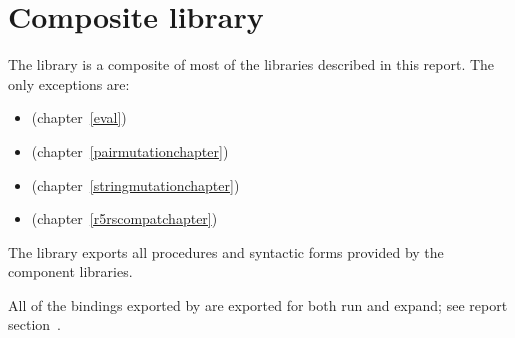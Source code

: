 \chapter{Composite library}
\label{complibchapter}

The  library is a composite of most of the libraries
described in this report.  The only exceptions are:
%
\begin{itemize}
\item {} (chapter~\ref{eval})
\item {} (chapter~\ref{pairmutationchapter})
\item {} (chapter~\ref{stringmutationchapter})
\item {} (chapter~\ref{r5rscompatchapter})
\end{itemize}
%
The library exports all procedures and syntactic forms provided by the
component libraries.

All of the bindings exported by \thersixlibrary{} are exported for both {\cf run}
and {\cf expand}; see report section~.

